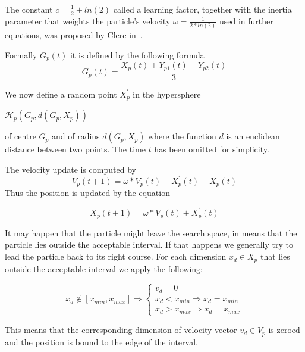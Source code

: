 \documentclass{mini}
\begin{document}
The constant $c = \frac{1}{2} + ln(2)$ called a learning factor, together with the inertia parameter that weights the particle's velocity $\omega = \frac{1}{2 * ln(2)}$ used in further equations, was proposed by Clerc in~\cite{pso_anal}.

Formally $G_p(t)$ it is defined by the following formula 
\begin{equation}
    G_p(t) = \frac{X_p(t) + Y_{p1}(t) + Y_{p2}(t)} {3}
\end{equation}

We now define a random point $X^{'}_p$ in the hypersphere
\begin{center}
    $\mathcal{H}_p(G_p, d(G_p, X_p))$ 
\end{center}
of centre $G_p$ and of radius $d(G_p, X_p)$ where the function $d$ is an euclidean distance between two points. The time $t$ has been omitted for simplicity.

The velocity update is computed by
\begin{equation}
    V_p(t+1) = \omega * V_p(t) + X^{'}_p(t) - X_p(t)
\end{equation}
Thus the position is updated by the equation

\begin{equation}
    X_p(t+1) = \omega * V_p(t) + X^{'}_p(t)
\end{equation}




It may happen that the particle might leave the search space, in means that the particle lies outside the acceptable interval. If that happens we generally try to lead the particle back to its right course. For each dimension $x_{d} \in X_p$ that lies  outside the acceptable interval we apply the following:

\[
x_{d} \notin [x_{min}, x_{max}] \Rightarrow \left \{
\begin{array}{ll}
v_{d} = 0 \\
x_d < x_{min} \Rightarrow x_d = x_{min} \\
x_d > x_{max} \Rightarrow x_d = x_{max}
\end{array}
\right.
\]

This means that the corresponding dimension of velocity vector $v_d \in V_p$ is zeroed and the position is bound to the edge of the interval.
\end{document}
